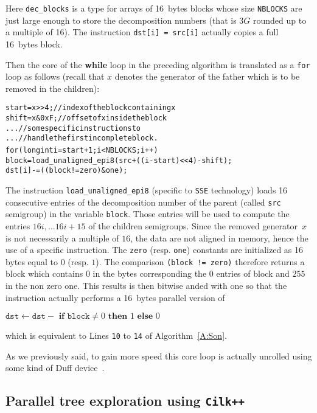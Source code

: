 \documentclass[reqno]{amsart}
\theoremstyle{plain}
\theoremstyle{definition}
\newcommand{\CilkP}{\texttt{Cilk++}\xspace}
\newcommand{\SSE}{\texttt{SSE}\xspace}
\renewcommand{\tt}[1]{\texttt{#1}}
\begin{document}
Here \tt{dec\_blocks} is a type for arrays of 16~bytes blocks whose size
\tt{NBLOCKS} are just large enough to store the decomposition numbers (that is
$3G$ rounded up to a multiple of 16). The instruction \tt{dst[i] = src[i]}
actually copies a full 16~bytes block.

Then the core of the \textbf{while} loop in the preceding algorithm is
translated as a \texttt{for} loop as follows (recall that $x$ denotes the generator of
the father which is to be removed in the children):

{\small
\begin{alltt}
start = x >> 4;      // index of the block containing x
shift = x & 0xF;     // offset of x inside the block
...                  // some specific instructions to
...                  // handle the first incomplete block.
for (long int i=start+1; i<NBLOCKS; i++) {
  block = load_unaligned_epi8(src + ((i-start)<<4) - shift);
  dst[i] -= ((block != zero) & one);
}
\end{alltt}
}

The instruction \tt{load\_unaligned\_epi8} (specific to \SSE technology) loads
 16 consecutive entries of the decomposition number
of the parent (called \tt{src} semigroup) in the variable \tt{block}.
Those entries will be used to compute
the entries $16i, \dots 16i+15$ of the children semigroups. Since the removed
generator~$x$ is not necessarily a multiple of $16$, the data are not aligned
in memory, hence the use of a specific instruction. The \tt{zero}
(resp. \tt{one}) constants are initialized as 16 bytes equal to $0$
(resp. $1$). The comparison \tt{(block != zero)} therefore returns a block
which contains $0$ in the bytes corresponding the $0$ entries of block and
$255$ in the non zero one. This results is then bitwise anded with one so that
the instruction actually performs a 16~bytes parallel version of


\begin{center}
$\tt{dst} \gets \tt{dst} - \textbf{ if } \tt{block} \neq 0 \textbf{ then } 1 \textbf{ else } 0$
\end{center}

\noindent which is equivalent to Lines \tt{10} to \tt{14} of Algorithm~\ref{A:Son}.
\medskip

As we previously said, to gain more speed this core loop is actually unrolled
using some kind of Duff device~\cite{WikipediaDuff}. 

\subsection{Parallel tree exploration using \CilkP}
\end{document}
